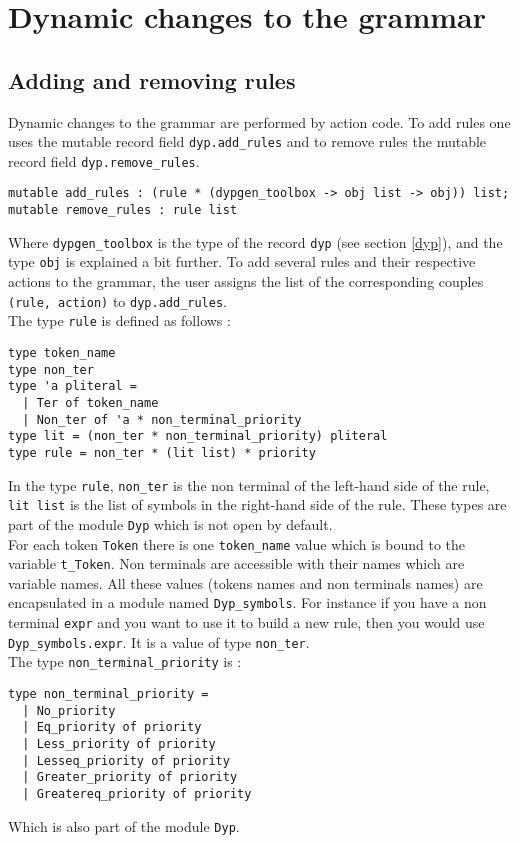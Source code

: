 \documentclass[12pt]{article}
\begin{document}
{\section{Dynamic changes to the grammar}

\subsection{Adding and removing rules}\label{adding rules}

Dynamic changes to the grammar are performed by action code. To add rules one uses the mutable record field \texttt{dyp.add\_rules} and to remove rules the mutable record field \texttt{dyp.remove\_rules}.
\begin{verbatim}
mutable add_rules : (rule * (dypgen_toolbox -> obj list -> obj)) list;
mutable remove_rules : rule list
\end{verbatim}
Where \verb|dypgen_toolbox| is the type of the record \verb|dyp| (see section \ref{dyp}), and the type \verb|obj| is explained a bit further. To add several rules and their respective actions to the grammar, the user assigns the list of the corresponding couples \texttt{(rule, action)} to \texttt{dyp.add\_rules}.\\

The type \texttt{rule} is defined as follows :
\begin{verbatim}
type token_name
type non_ter
type 'a pliteral =
  | Ter of token_name
  | Non_ter of 'a * non_terminal_priority
type lit = (non_ter * non_terminal_priority) pliteral
type rule = non_ter * (lit list) * priority
\end{verbatim}
In the type \verb|rule|, \verb|non_ter| is the non terminal of the left-hand side of the rule, \verb|lit list| is the list of symbols in the right-hand side of the rule. These types are part of the module \verb|Dyp| which is not open by default.\\

For each token \texttt{Token} there is one \verb|token_name| value which is bound to the variable \verb|t_Token|. Non terminals are accessible with their names which are variable names. All these values (tokens names and non terminals names) are encapsulated in a module named \verb|Dyp_symbols|. For instance if you have a non terminal \verb|expr| and you want to use it to build a new rule, then you would use \verb|Dyp_symbols.expr|. It is a value of type \verb|non_ter|.\\

The type \texttt{non\_terminal\_priority} is :
\begin{verbatim}
type non_terminal_priority =
  | No_priority
  | Eq_priority of priority
  | Less_priority of priority
  | Lesseq_priority of priority
  | Greater_priority of priority
  | Greatereq_priority of priority
\end{verbatim}
Which is also part of the module \verb|Dyp|.\\

}
\end{document}
